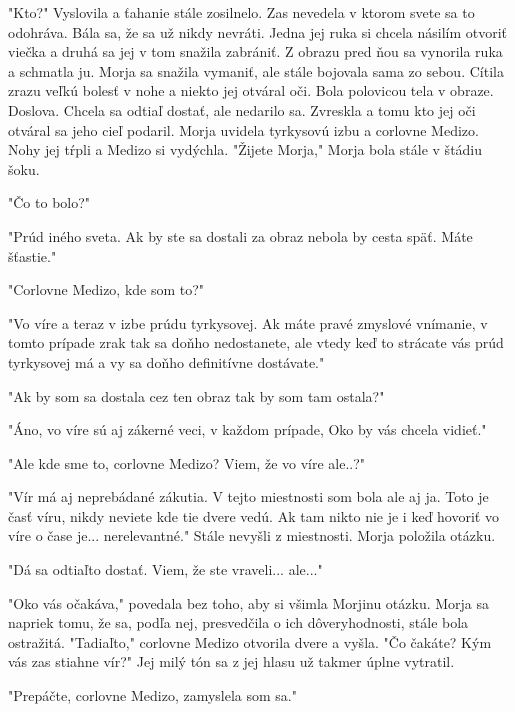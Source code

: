\documentclass{book}
\begin{document}
"$ $Kto?"$ $ Vyslovila a ťahanie stále zosilnelo. Zas nevedela v ktorom svete sa to odohráva. Bála sa, že sa už nikdy nevráti. Jedna jej ruka si chcela násilím otvoriť viečka a druhá sa jej v tom snažila zabrániť. Z obrazu pred ňou sa vynorila ruka a schmatla ju. Morja sa snažila vymaniť, ale stále bojovala sama zo sebou. Cítila zrazu veľkú bolesť v nohe a niekto jej otváral oči. Bola polovicou tela v obraze. Doslova. Chcela sa odtiaľ dostať, ale nedarilo sa. Zvreskla a tomu kto jej oči otváral sa jeho cieľ podaril. Morja uvidela tyrkysovú izbu a corlovne Medizo. Nohy jej tŕpli a Medizo si vydýchla. "$ $Žijete Morja,"$ $ Morja bola stále v štádiu šoku.

"$ $Čo to bolo?"

"$ $Prúd iného sveta. Ak by ste sa dostali za obraz nebola by cesta späť. Máte šťastie."

"$ $Corlovne Medizo, kde som to?"

"$ $Vo víre a teraz v izbe prúdu tyrkysovej. Ak máte pravé zmyslové vnímanie, v tomto prípade zrak tak sa doňho nedostanete, ale vtedy keď to strácate vás prúd tyrkysovej má a vy sa doňho definitívne dostávate."

"$ $Ak by som sa dostala cez ten obraz tak by som tam ostala?"

"$ $Áno, vo víre sú aj zákerné veci, v každom prípade, Oko by vás chcela vidieť."

"$ $Ale kde sme to, corlovne Medizo? Viem, že vo víre ale..?"

"$ $Vír má aj neprebádané zákutia. V tejto miestnosti som bola ale aj ja. Toto je časť víru, nikdy neviete kde tie dvere vedú. Ak tam nikto nie je i keď hovoriť vo víre o čase je... nerelevantné."$ $ Stále nevyšli z miestnosti. Morja položila otázku.

"$ $Dá sa odtiaľto dostať. Viem, že ste vraveli... ale..."

"$ $Oko vás očakáva,"$ $ povedala bez toho, aby si všimla Morjinu otázku. Morja sa napriek tomu, že sa, podľa nej, presvedčila o ich dôveryhodnosti, stále bola ostražitá. "$ $Tadiaľto,"$ $ corlovne Medizo otvorila dvere a vyšla. "$ $Čo čakáte? Kým vás zas stiahne vír?"$ $ Jej milý tón sa z jej hlasu už takmer úplne vytratil.

"$ $Prepáčte, corlovne Medizo, zamyslela som sa."
\end{document}
